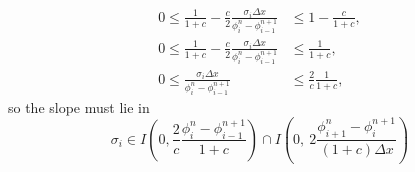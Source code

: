 \documentclass[../thesis.tex]{subfiles}
\begin{document}
\begin{equation}\label{eqn: urc-all c- sufficient}
    \begin{split}
        0
        \leq
        \frac{1}{1+c}
        -\frac{c}{2}
        \frac{\sigma_{i}\Delta x}
        {\phi_{i}^{n} - \phi_{i-1}^{n+1}}
        &\leq
        1 - \frac{c}{1+c},
        \\
        0
        \leq
        \frac{1}{1+c}
        -\frac{c}{2}
        \frac{\sigma_{i}\Delta x}
        {\phi_{i}^{n} - \phi_{i-1}^{n+1}}
        &\leq
        \frac{1}{1+c},
        \\
        0
        \leq
        \frac{\sigma_{i}\Delta x}
        {\phi_{i}^{n} - \phi_{i-1}^{n+1}}
        &\leq
        \frac{2}{c}
        \frac{1}{1+c},
    \end{split}
\end{equation}
so the slope must lie in
\begin{equation}
    \label{eqn:slope-sufficient}
    \sigma_{i}
    \in
    I\left(
        0,
        \frac{2}{c}
        \frac{\phi_{i}^{n} - \phi_{i-1}^{n+1}}{1+c}
    \right)
    \cap
    I\left(
        0,
        ~2\frac{\phi_{i+1}^{n} - \phi_{i}^{n+1}}{(1+c)\Delta x}
    \right)
\end{equation}
\end{document}
